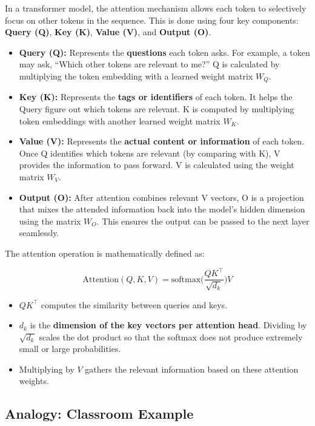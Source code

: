 \documentclass[a4paper, 12pt]{article}
\begin{document}
In a transformer model, the attention mechanism allows each token to selectively focus on other tokens in the sequence. This is done using four key components: \textbf{Query (Q)}, \textbf{Key (K)}, \textbf{Value (V)}, and \textbf{Output (O)}.  

\begin{itemize}
    \item \textbf{Query (Q):} Represents the \textbf{questions} each token asks. For example, a token may ask, ``Which other tokens are relevant to me?'' Q is calculated by multiplying the token embedding with a learned weight matrix $W_Q$.
    
    \item \textbf{Key (K):} Represents the \textbf{tags or identifiers} of each token. It helps the Query figure out which tokens are relevant. K is computed by multiplying token embeddings with another learned weight matrix $W_K$.
    
    \item \textbf{Value (V):} Represents the \textbf{actual content or information} of each token. Once Q identifies which tokens are relevant (by comparing with K), V provides the information to pass forward. V is calculated using the weight matrix $W_V$.
    
    \item \textbf{Output (O):} After attention combines relevant V vectors, O is a projection that mixes the attended information back into the model’s hidden dimension using the matrix $W_O$. This ensures the output can be passed to the next layer seamlessly.
\end{itemize}

The attention operation is mathematically defined as:

\[
\text{Attention}(Q,K,V) = \text{softmax}\Big(\frac{QK^\top}{\sqrt{d_k}}\Big)V
\]

\begin{itemize}
    \item $QK^\top$ computes the similarity between queries and keys.  
    \item $d_k$ is the \textbf{dimension of the key vectors per attention head}. Dividing by $\sqrt{d_k}$ scales the dot product so that the softmax does not produce extremely small or large probabilities.  
    \item Multiplying by $V$ gathers the relevant information based on these attention weights.
\end{itemize}

\subsection*{Analogy: Classroom Example}
\end{document}
